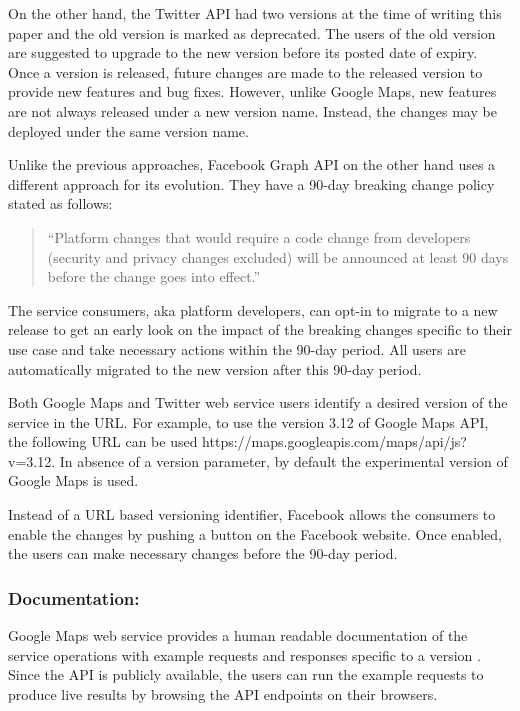 \documentclass[runningheads,a4paper]{llncs}
\begin{document}
On the other hand, the Twitter API had two versions at the time of writing this paper \cite{twitter_api} and the old version is marked as deprecated. The users of the old version are suggested to upgrade to the new version before its posted date of expiry. Once a version is released, future changes are made to the released version to provide new features and bug fixes. However, unlike Google Maps, new features are not always released under a new version name. Instead, the changes may be deployed under the same version name.

Unlike the previous approaches, Facebook Graph API on the other hand uses a different approach for its evolution. They have a 90-day breaking change policy stated as follows: \cite{facebook_api}

\begin{quote}
``Platform changes that would require a code change from developers (security and privacy changes excluded) will be announced at least 90 days before the change goes into effect.''
\end{quote}

The service consumers, aka platform developers, can opt-in to migrate to a new release to get an early look on the impact of the breaking changes specific to their use case and take necessary actions within the 90-day period. All users are automatically migrated to the new version after this 90-day period.

Both Google Maps and Twitter web service users identify a desired version of the service in the URL. For example, to use the version 3.12 of Google Maps API, the following URL can be used https://maps.googleapis.com/maps/api/js?v=3.12. In absence of a version parameter, by default the experimental version of Google Maps is used.

Instead of a URL based versioning identifier, Facebook allows the consumers to enable the changes by pushing a button on the Facebook website. Once enabled, the users can make necessary changes before the 90-day period.

\subsubsection{Documentation:}
Google Maps web service provides a human readable documentation of the service operations with example requests and responses specific to a version \cite{google_maps_services}. Since the API is publicly available, the users can run the example requests to produce live results by browsing the API endpoints on their browsers.
\end{document}
